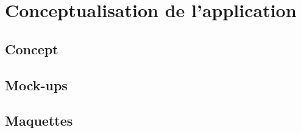 \chapter{Conceptualisation de l'application}
\section{Concept}
\section{Mock-ups}
\section{Maquettes}

